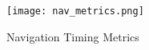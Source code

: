 











\begin{figure}[h!]
\begin{center}
\texttt{[image: nav\_metrics.png]}
\caption{Navigation Timing Metrics}
\label{figure:navigation_timing_metrics}
\end{center}
\end{figure}


